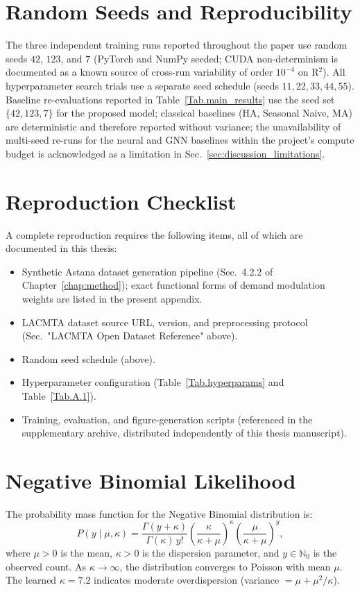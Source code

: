 \section{Random Seeds and Reproducibility}

The three independent training runs reported throughout the paper use random seeds $42$, $123$, and $7$ (PyTorch and NumPy seeded; CUDA non-determinism is documented as a known source of cross-run variability of order $10^{-4}$ on R$^2$). All hyperparameter search trials use a separate seed schedule (seeds $11, 22, 33, 44, 55$). Baseline re-evaluations reported in Table~\ref{Tab.main_results} use the seed set $\{42, 123, 7\}$ for the proposed model; classical baselines (HA, Seasonal Naive, MA) are deterministic and therefore reported without variance; the unavailability of multi-seed re-runs for the neural and GNN baselines within the project's compute budget is acknowledged as a limitation in Sec.~\ref{sec:discussion_limitations}.

\section{Reproduction Checklist}

A complete reproduction requires the following items, all of which are documented in this thesis:
\begin{itemize}
    \item Synthetic Astana dataset generation pipeline (Sec.~4.2.2 of Chapter~\ref{chap:method}); exact functional forms of demand modulation weights are listed in the present appendix.
    \item LACMTA dataset source URL, version, and preprocessing protocol (Sec.~"LACMTA Open Dataset Reference" above).
    \item Random seed schedule (above).
    \item Hyperparameter configuration (Table~\ref{Tab.hyperparams} and Table~\ref{Tab.A.1}).
    \item Training, evaluation, and figure-generation scripts (referenced in the supplementary archive, distributed independently of this thesis manuscript).
\end{itemize}

\section{Negative Binomial Likelihood}

The probability mass function for the Negative Binomial distribution is:
\begin{equation}
    P(y \mid \mu, \kappa) = \frac{\Gamma(y + \kappa)}{\Gamma(\kappa) \, y!} \left( \frac{\kappa}{\kappa + \mu} \right)^{\kappa} \left( \frac{\mu}{\kappa + \mu} \right)^{y},
\end{equation}
where $\mu > 0$ is the mean, $\kappa > 0$ is the dispersion parameter, and $y \in \mathbb{N}_0$ is the observed count. As $\kappa \to \infty$, the distribution converges to Poisson with mean $\mu$. The learned $\kappa = 7.2$ indicates moderate overdispersion (variance $= \mu + \mu^2 / \kappa$).

